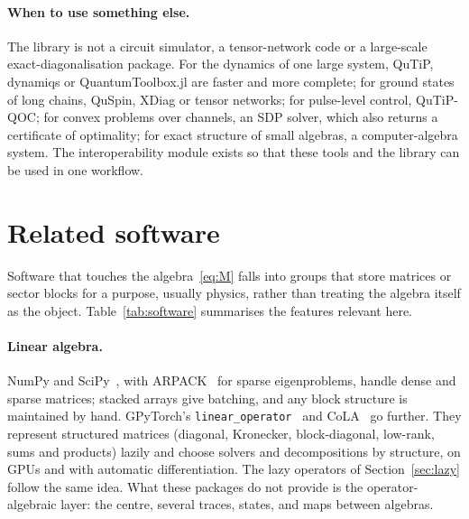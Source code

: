 \documentclass[11pt]{article}
\begin{document}
\paragraph{When to use something else.} The library is not a circuit simulator, a tensor-network code or a large-scale
exact-diagonalisation package. For the dynamics of one large system, QuTiP, dynamiqs or QuantumToolbox.jl are faster and
more complete; for ground states of long chains, QuSpin, XDiag or tensor networks; for pulse-level control, QuTiP-QOC;
for convex problems over channels, an SDP solver, which also returns a certificate of optimality; for exact structure of
small algebras, a computer-algebra system. The interoperability module exists so that these tools and the library can
be used in one workflow.

\section{Related software}\label{sec:related}

Software that touches the algebra~\eqref{eq:M} falls into groups that store matrices or sector blocks for a purpose,
usually physics, rather than treating the algebra itself as the object. Table~\ref{tab:software} summarises the
features relevant here.

\paragraph{Linear algebra.} NumPy and SciPy~\cite{harris2020,virtanen2020}, with ARPACK~\cite{lehoucq1998} for sparse
eigenproblems, handle dense and sparse matrices; stacked arrays give batching, and any block structure is maintained by
hand. GPyTorch's \texttt{linear\_operator}~\cite{gardner2018,linearoperator} and CoLA~\cite{potapczynski2023} go
further. They represent structured matrices (diagonal, Kronecker, block-diagonal, low-rank, sums and products) lazily
and choose solvers and decompositions by structure, on GPUs and with automatic differentiation. The lazy operators of
Section~\ref{sec:lazy} follow the same idea. What these packages do not provide is the operator-algebraic layer: the
centre, several traces, states, and maps between algebras.
\end{document}
